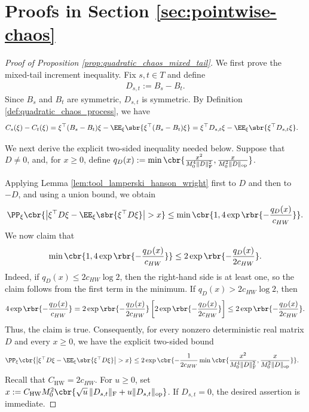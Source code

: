 \documentclass[11pt]{article}
\begin{document}
\iffalse
\section{Proofs in Section \ref{sec:pointwise-chaos}}\label{app:proofs_quadratic_chaos}
\begin{proof}[Proof of Proposition
\ref{prop:quadratic_chaos_mixed_tail}]
We first prove the mixed-tail increment inequality. Fix $s,t\in T$ and
define
\begin{align*}
D_{s,t}:=B_s-B_t.
\end{align*}
Since $B_s$ and $B_t$ are symmetric, $D_{s,t}$ is symmetric. By
Definition \ref{def:quadratic_chaos_process}, we have
\begin{align*}
C_s(\xi)-C_t(\xi)
&=
\xi^\top(B_s-B_t)\xi
-\EE_\xi\sbr{
\xi^\top(B_s-B_t)\xi
}=
\xi^\top D_{s,t}\xi
-\EE_\xi\sbr{
\xi^\top D_{s,t}\xi
}.
\end{align*}

We next derive the explicit two-sided inequality needed below. Suppose that
$D\ne0$, and, for $x\ge0$, define $q_D(x)
:=
\min\cbr{
\frac{x^2}{M_0^4\|D\|_{\mathrm F}^2},
\frac{x}{M_0^2\|D\|_{\mathrm{op}}}
}$. 

Applying Lemma \ref{lem:tool_lamperski_hanson_wright} first to $D$ and then
to $-D$, and using a union bound, we obtain
\begin{align}
\PP_\xi\cbr{
\left|
\xi^\top D\xi
-\EE_\xi\sbr{\xi^\top D\xi}
\right|>x
}\le
\min\cbr{
1,
4\exp\rbr{-\frac{q_D(x)}{c_{HW}}}
}.
\label{eq:explicit_two_sided_hanson_wright}
\end{align}
We now claim that
\begin{align*}
\min\cbr{
1,
4\exp\rbr{-\frac{q_D(x)}{c_{HW}}}
}
\le
2\exp\rbr{-\frac{q_D(x)}{2c_{HW}}}.
\end{align*}
Indeed, if $q_D(x)\le 2c_{HW}\log2$, then the right-hand side is at least one,
so the claim follows from the first term in the minimum. If
$q_D(x)>2c_{HW}\log2$, then
\begin{align*}
4\exp\rbr{-\frac{q_D(x)}{c_{HW}}}=
2\exp\rbr{-\frac{q_D(x)}{2c_{HW}}}
\left[
2\exp\rbr{-\frac{q_D(x)}{2c_{HW}}}
\right]\le
2\exp\rbr{-\frac{q_D(x)}{2c_{HW}}}.
\end{align*}
Thus, the claim is true. Consequently, for every nonzero deterministic real matrix $D$ and every
$x\ge0$, we have the explicit two-sided bound
\begin{align}
&\PP_\xi\cbr{
\left|
\xi^\top D\xi
-\EE_\xi\sbr{\xi^\top D\xi}
\right|>x
}\notag\le
2\exp\cbr{
-\frac1{2c_{HW}}
\min\cbr{
\frac{x^2}{M_0^4\|D\|_{\mathrm F}^2},
\frac{x}{M_0^2\|D\|_{\mathrm{op}}}
}
}.
\label{eq:explicit_two_sided_hanson_wright}
\end{align}
Recall that $C_{\mathrm{HW}}=2c_{HW}$. 
For $u\ge0$, set $x:=
C_{\mathrm{HW}}M_0^2
\cbr{
\sqrt{u}\,\|D_{s,t}\|_{\mathrm F}
+u\|D_{s,t}\|_{\mathrm{op}}
}$. If $D_{s,t}=0$, the desired assertion is immediate. 


\end{proof}
\end{document}

